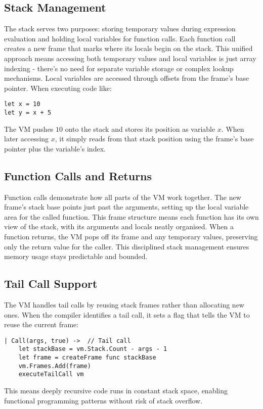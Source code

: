 \subsection{Stack Management}\label{subsec:stack-management}

The stack serves two purposes: storing temporary values during expression evaluation and holding local variables for function calls.
Each function call creates a new frame that marks where its locals begin on the stack.
This unified approach means accessing both temporary values and local variables is just array indexing - there's no 
need for separate variable storage or complex lookup mechanisms.
Local variables are accessed through offsets from the frame's base pointer.
When executing code like:

\begin{verbatim}
let x = 10
let y = x + 5
\end{verbatim}

The VM pushes $10$ onto the stack and stores its position as variable $x$.
When later accessing $x$, it simply reads 
from that stack position using the frame's base pointer plus the variable's index.

\subsection{Function Calls and Returns}\label{subsec:function-calls-and-returns}

Function calls demonstrate how all parts of the VM work together.
The new frame's stack base points just past the arguments, setting up the local variable area for the called function. 
This frame structure means each function has its own view of the stack, with its arguments and locals neatly organised.
When a function returns, the VM pops off its frame and any temporary values, preserving only the return value for the caller.
This disciplined stack management ensures memory usage stays predictable and bounded.

\subsection{Tail Call Support}\label{subsec:tail-call-support}

The VM handles tail calls by reusing stack frames rather than allocating new ones.
When the compiler identifies a tail call, it sets a flag that tells the VM to reuse the current frame:

\begin{verbatim}
| Call(args, true) ->  // Tail call
    let stackBase = vm.Stack.Count - args - 1
    let frame = createFrame func stackBase
    vm.Frames.Add(frame)
    executeTailCall vm
\end{verbatim}
This means deeply recursive code runs in constant stack space, enabling functional programming patterns without risk of stack overflow.

